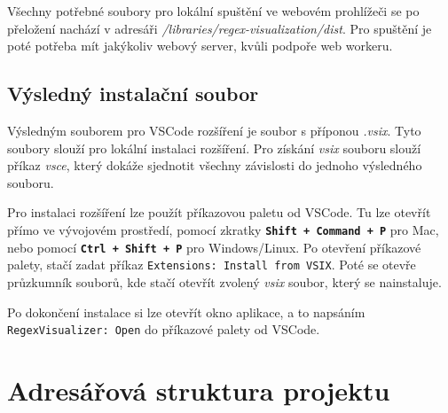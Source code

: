 \documentclass[czech,bachelor]{diploma}
\begin{document}
Všechny potřebné soubory pro lokální spuštění ve webovém prohlížeči se po přeložení nachází v adresáři \textit{/libraries/regex-visualization/dist}. 
Pro spuštění je poté potřeba mít jakýkoliv webový server, kvůli podpoře web workeru.

\section*{Výsledný instalační soubor}

Výsledným souborem pro VSCode rozšíření je soubor s příponou \textit{.vsix}.
Tyto soubory slouží pro lokální instalaci rozšíření.
Pro získání \textit{vsix} souboru slouží příkaz \textit{vsce}, který dokáže sjednotit všechny závislosti do jednoho výsledného souboru.

Pro instalaci rozšíření lze použít příkazovou paletu od VSCode.
Tu lze otevřít přímo ve vývojovém prostředí, pomocí zkratky \texttt{\textbf{Shift + Command + P}} pro Mac, nebo pomocí \texttt{\textbf{Ctrl + Shift + P}} pro Windows/Linux.
Po otevření příkazové palety, stačí zadat příkaz \texttt{Extensions: Install from VSIX}.
Poté se otevře průzkumník souborů, kde stačí otevřít zvolený \textit{vsix} soubor, který se nainstaluje.

Po dokončení instalace si lze otevřít okno aplikace, a to napsáním \texttt{RegexVisualizer: Open} do příkazové palety od VSCode.

\chapter{Adresářová struktura projektu}\label{sec:FileStructure}

\end{document}
